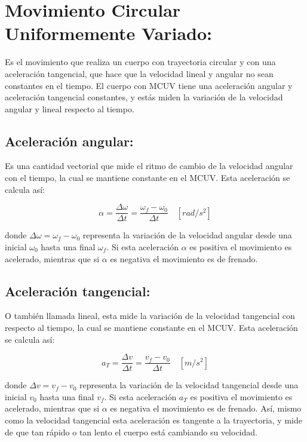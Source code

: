 \section{Movimiento Circular Uniformemente Variado:}

Es el movimiento que realiza un cuerpo con trayectoria circular y con una aceleración tangencial, que hace que la velocidad 
lineal y angular no sean constantes en el tiempo. El cuerpo con MCUV tiene una aceleración angular y aceleración tangencial 
constantes, y estás miden la variación de la velocidad angular y lineal respecto al tiempo.\\

\subsection{Aceleración angular:}

Es una cantidad vectorial que mide el ritmo de cambio de la velocidad angular con el tiempo, la cual se mantiene constante en el 
MCUV. Esta aceleración se calcula así:

\begin{equation}
\alpha = \frac{\Delta \omega}{\Delta t} =  \frac{\omega_f - \omega_0}{\Delta t}\quad [rad/s^2]
\end{equation}
  

donde $\Delta \omega = \omega_f-\omega_0$ representa la variación de la velocidad angular desde una inicial $\omega_0$ hasta una 
final $\omega_f$. Si esta aceleración $\alpha$ es positiva el movimiento es acelerado, mientras que si $\alpha$ es negativa el 
movimiento es de frenado.

\subsection{Aceleración tangencial:}

O también llamada lineal, esta mide la variación de la velocidad tangencial con respecto al tiempo, la cual se mantiene constante 
en el MCUV. Esta aceleración se calcula así:

\begin{equation}
a_T =\frac{\Delta v}{\Delta t} =\frac{v_f-v_0}{\Delta t}\quad [m/s^2]
\end{equation} 

donde $\Delta v = v_f-v_0$ representa la variación de la velocidad tangencial desde una inicial $v_0$ hasta una final $v_f$. Si 
esta aceleración $a_T$ es positiva el movimiento es acelerado, mientras que si $\alpha$ es negativa el movimiento es de frenado. 
Así, mismo como la velocidad tangencial esta aceleración es tangente a la trayectoria, y mide de que tan rápido o tan lento el 
cuerpo está cambiando su velocidad.

